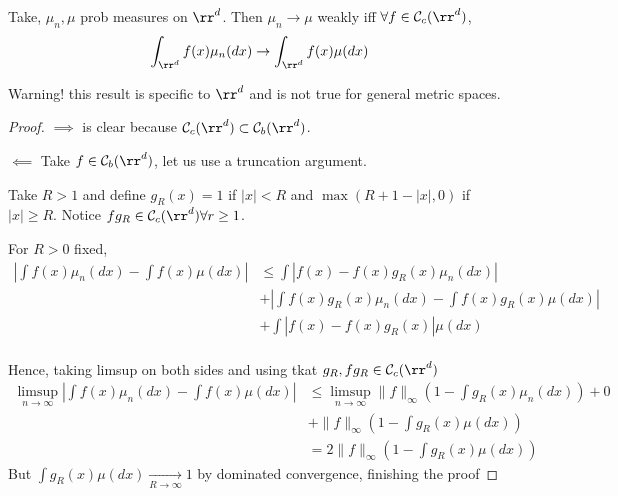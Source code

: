\documentclass[../main.tex]{subfiles}
\begin{document}
\begin{theorem}
    Take, $\mu_n, \mu$ prob measures on $\rr^d$. Then $\mu_n \to \mu$ weakly iff
    $\forall f \in \mathcal{C}_c(\rr^d)$, $$\int_{\rr^d} f(x) \mu_n(dx) \to
    \int_{\rr^d}f(x)\mu(dx)$$
\end{theorem}
{\color{red} Warning!} this result is specific to $\rr^d$ and is not true for
general metric spaces.
\begin{proof}
  $\boxed{\implies}$ is clear because $\mathcal{C}_c(\rr^d) \subset
  \mathcal{C}_b(\rr^d)$.

  $\boxed{\impliedby}$ Take $f \in \mathcal{C}_b(\rr^d)$, let us use a
  truncation argument. 

  Take $R > 1$ and define $g_R(x) = 1$ if $|x|< R$ and
  $\max(R+1 - |x|, 0)$ if $|x| \geq R$. 
  Notice $f g_R \in \mathcal{C}_c (\rr^d)
  \forall r \geq 1$.

  For $R > 0$ fixed, 
  \begin{align*}
    \left| \int f(x)\mu_n(dx) - \int f(x) \mu(dx) \right| &\leq \int |f(x) -
    f(x) g_R(x) \mu_n(dx)| \\ &+ \left| \int f(x)g_R(x)\mu_n(dx) - \int f(x) g_R(x)
    \mu(dx)\right| \\ &+ \int |f(x) - f(x)g_R(x)|\mu(dx)  \\
  \end{align*} 

  Hence, taking limsup on both sides and using tkat $g_R, fg_R \in
  \mathcal{C}_c(\rr^d)$
  \begin{align*}
    \limsup_{n \to \infty}
    \left| \int f(x)\mu_n(dx) - \int f(x) \mu(dx) \right| &\leq
    \limsup_{n \to \infty }\|f\|_{\infty}( 1 - \int g_R(x)\mu_n(dx)) + 0 \\ &+ \|f\|_{\infty} (1 - \int
    g_R(x)\mu(dx)) \\
    &= 2 \|f\|_{\infty} (1 - \int
    g_R(x)\mu(dx))
  \end{align*}
  But $\int g_R(x) \mu(dx) \underset{R \to \infty}{\longrightarrow} 1$ by
  dominated convergence, finishing the proof
\end{proof} 
\end{document}
